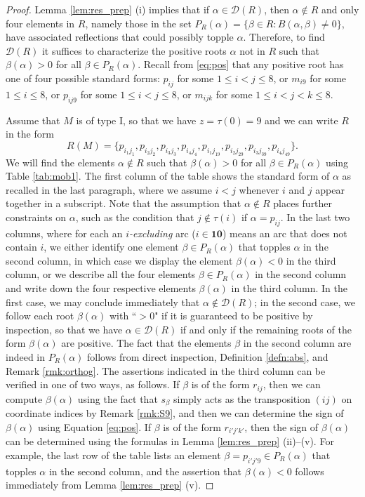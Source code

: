 \documentclass[10pt,a4paper]{amsart}
\numberwithin{equation}{section}
\newcommand{\al}{\alpha}
\newcommand{\be}{\beta}
\newcommand{\res}{\mathscr{D}}
\newcommand{\ten}{\mathbf{10}}
\newcommand{\pra}{P_R(\al)}
\begin{document}
\begin{proof}
  Lemma \ref{lem:res_prep} (i) implies that if
  $\al\in \res(R)$, then $\al\notin R$ and only four elements in $R$,
  namely those in the set $\pra=\{\be\in R: B(\al,\be)\neq0\}$, have associated
  reflections that could possibly topple $\al$. Therefore, to
  find $\res(R)$ it suffices to characterize the positive roots $\al$ not in $R$
  such that $\beta(\al)>0$ for all $\be\in \pra$. Recall from \eqref{eq:pos}
  that any positive root has one of four possible standard forms: $p_{ij}$ for some
  $1\le i<j\le 8$, or $m_{i9}$ for some $1\le i \le 8$, or $p_{ij9}$ for some
  $1\le i<j\le 8$, or $m_{ijk}$ for some $1\le i<j<k\le 8$.


  Assume that $M$ is of type I, so that we have $z=\tau(0)=9$ and we can write
  $R$ in the form \[ R(M)=\{p_{i_1j_1}, p_{i_2j_2}, p_{i_3j_3}, p_{i_4j_4},
  p_{i_1j_19}, p_{i_2j_29}, p_{i_3j_39}, p_{i_4j_49}\}. \] We will find the
  elements $\al\notin R$ such that $\be(\al)>0$ for all $\be\in \pra$ using
  Table \ref{tab:mob1}. The first column of the table shows the standard form of
  $\al$ as recalled in the last paragraph, where we assume $i<j$ whenever $i$
  and $j$ appear together in a subscript. Note that the assumption that
  $\al\notin R$ places further constraints on $\al$, such as the condition that
  $j\notin \tau(i)$ if $\al=p_{ij}$.
  In the last two columns, where for each an
  \emph{$i$-excluding} arc ($i\in \ten$) means an arc that does not contain $i$,
  we either identify one element $\be\in \pra$ that topples $\al$ in the second
  column, in which case we display the element $\be(\al)<0$ in the third column,
  or we describe all the four elements $\be\in\pra$ in the second column and
  write down the four respective elements $\be(\al)$ in the third column.   In
  the first case, we may conclude immediately that $\al\notin \res(R)$; in the
  second case, we follow each root $\be(\al)$ with ``$>0$" if it is guaranteed
  to be positive by inspection, so that we have $\al\in \res(R)$ if and only if
  the remaining roots of the form $\be(\al)$ are positive. The fact that the
  elements $\be$ in the second column are indeed in $\pra$ follows from direct
  inspection, Definition \ref{defn:abs}, and Remark \ref{rmk:orthog}.
  The assertions indicated in the third column can be verified in one of two
  ways, as follows. If $\be$ is of the form $r_{ij}$, then we can compute
  $\be(\al)$ using the fact that $s_\be$ simply acts as the transposition $(ij)$
  on coordinate indices by Remark \ref{rmk:S9}, and then we can determine the
  sign of $\be(\al)$ using Equation \eqref{eq:pos}. If $\be$ is of the form
  $r_{i'j'k'}$, then the sign of $\be(\al)$ can be determined using the formulas
  in Lemma \ref{lem:res_prep} (ii)--(v). For example, the last row of the table
  lists an element $\be=p_{i'j'9}\in\pra $ that topples $\al$ in the second
  column, and the assertion that $\be(\al)<0$ follows immediately from Lemma
  \ref{lem:res_prep} (v).
  


\end{proof}
\end{document}

